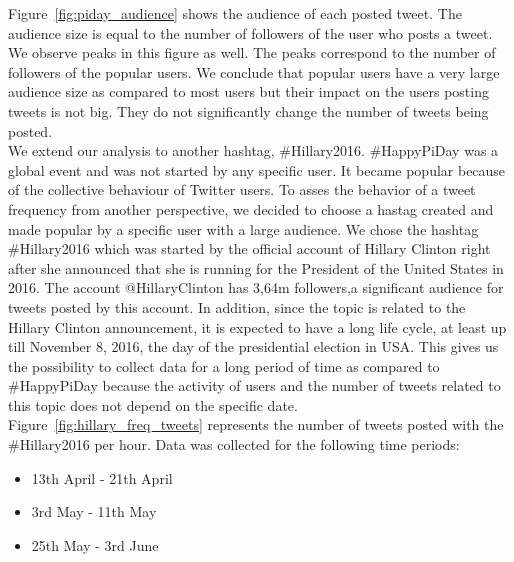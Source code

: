 \documentclass[journal, a4paper, 12pt]{article}
\begin{document}
Figure~\ref{fig:piday_audience} shows the audience of each posted tweet. The audience size is equal to the number of followers of the user who posts a tweet. We observe peaks in this figure as well. The peaks correspond to the number of followers of the popular users. We conclude that popular users have a very large audience size as compared to most users but their impact on the users posting tweets is not big. They do not significantly change the number of tweets being posted. 
\\
    	
    
We extend our analysis to another hashtag, \#Hillary2016. \#HappyPiDay was a global event and was not started by any specific user. It became popular because of the collective behaviour of Twitter users. To asses the behavior of a tweet frequency from another perspective, we decided to choose a hastag created and made popular by a specific user with a large audience. We chose the hashtag \#Hillary2016 which was started by the official account of Hillary Clinton right after she announced that she is running for the President of the United States in 2016. The account @HillaryClinton has 3,64m followers,a significant audience for tweets posted by this account. In addition, since the topic is related to the Hillary Clinton announcement, it is expected to have a long life cycle, at least up till November 8, 2016, the day of the presidential election in USA. This gives us the possibility to collect data for a long period of time as compared to \#HappyPiDay because the activity of users and the number of tweets related to this topic does not depend on the specific date.
\\

Figure~\ref{fig:hillary_freq_tweets} represents the number of tweets posted with the \#Hillary2016 per hour. Data was collected for the following time periods:
\begin{itemize}
\item 13th April - 21th April
\item 3rd May - 11th May
\item 25th May - 3rd June
\end{itemize}
\end{document}
